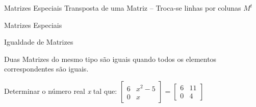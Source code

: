 \documentclass[aspectratio=169,xcolor=dvipsnames]{beamer}
\begin{document}
\begin{frame}{Matrizes Especiais}
  Transposta de uma Matriz -- Troca-se linhas por colunas $M^t$
  \begin{tasks}

  \end{tasks}
  
\end{frame}


\begin{frame}{Matrizes Especiais}
  \begin{center}
    Igualdade de Matrizes
  \end{center}

  Duas Matrizes do mesmo tipo são iguais quando todos os elementos correspondentes são iguais.

  \begin{examples}
    Determinar o número real \textit{x} tal que: $\begin{bmatrix}
      6 & x^2-5 \\
      0 & x
    \end{bmatrix} = \begin{bmatrix}
      6 & 11 \\
      0 & 4
    \end{bmatrix}$
    
  \end{examples}
\end{frame}
\end{document}
